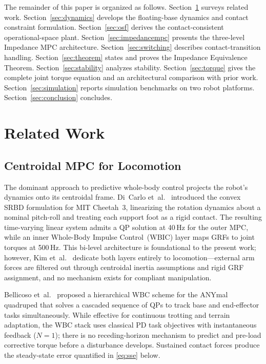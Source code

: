 The remainder of this paper is organized as follows.
Section~\ref{sec:related} surveys related work.
Section~\ref{sec:dynamics} develops the floating-base dynamics and contact
constraint formulation.
Section~\ref{sec:osf} derives the contact-consistent operational-space
plant.
Section~\ref{sec:impedancempc} presents the three-level Impedance MPC
architecture.
Section~\ref{sec:switching} describes contact-transition handling.
Section~\ref{sec:theorem} states and proves the Impedance Equivalence
Theorem.
Section~\ref{sec:stability} analyzes stability.
Section~\ref{sec:torque} gives the complete joint torque equation and an
architectural comparison with prior work.
Section~\ref{sec:simulation} reports simulation benchmarks on two robot
platforms.
Section~\ref{sec:conclusion} concludes.

\section{Related Work}\label{sec:related}

\subsection{Centroidal MPC for Locomotion}

The dominant approach to predictive whole-body control projects the robot's
dynamics onto its centroidal frame.
Di~Carlo et~al.~\cite{dicarlo2018dynamic} introduced the convex SRBD
formulation for MIT Cheetah~3, linearizing the rotation dynamics about a
nominal pitch-roll and treating each support foot as a rigid contact.
The resulting time-varying linear system admits a QP solution at 40\,Hz for
the outer MPC, while an inner Whole-Body Impulse Control~(WBIC) layer maps
GRFs to joint torques at 500\,Hz.
This bi-level architecture is foundational to the present work; however,
Kim et~al.~\cite{kim2019highly} dedicate both layers entirely to
locomotion---external arm forces are filtered out through centroidal inertia
assumptions and rigid GRF assignment, and no mechanism exists for compliant
manipulation.

Bellicoso et~al.~\cite{bellicoso2016perception} proposed a hierarchical WBC
scheme for the ANYmal quadruped that solves a cascaded sequence of QPs to
track base and end-effector tasks simultaneously.
While effective for continuous trotting and terrain adaptation, the WBC
stack uses classical PD task objectives with instantaneous feedback
($N{=}1$); there is no receding-horizon mechanism to predict and pre-load
corrective torque before a disturbance develops.
Sustained contact forces produce the steady-state error quantified in
\eqref{eq:sse} below.

